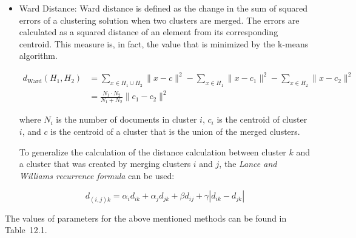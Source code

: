 \documentclass[11pt,openany,executivepaper]{book}
\begin{document}
\begin{itemize}
In contrast, the \textit{Weighted Pair Group Method with Centroid (WPGMC)}, also known as median clustering, down-weights bigger clusters so the similarity is calculated independently of the number of objects in the clusters:

\begin{equation}
d_{\text{WPGMC}}(H_k, (H_i, H_j)) =
\frac{d(H_k, H_i) + d(H_k, H_j)}{2} -
\frac{d(H_i, H_j)}{4}
\end{equation}

\item Ward Distance: Ward distance is defined as the change in the sum of squared errors of a clustering solution when two clusters are merged. The errors are calculated as a squared distance of an element from its corresponding centroid. This measure is, in fact, the value that is minimized by the k-means algorithm.

\begin{equation}
\begin{aligned}
d_{\text{Ward}}(H_1, H_2)
&= \sum_{x \in H_1 \cup H_2} \|x - c\|^2
   - \sum_{x \in H_1} \|x - c_1\|^2
   - \sum_{x \in H_2} \|x - c_2\|^2 \\
&= \frac{N_1 \cdot N_2}{N_1 + N_2} \| c_1 - c_2 \|^2
\end{aligned}
\end{equation}

where $N_i$ is the number of documents in cluster $i$, $c_i$ is the centroid of cluster $i$, and $c$ is the centroid of a cluster that is the union of the merged clusters.

To generalize the calculation of the distance calculation between cluster $k$ and a cluster that was created by merging clusters $i$ and $j$, the \textit{Lance and Williams recurrence formula} can be used:

\begin{equation}
d_{(i,j)k} = \alpha_i d_{ik} + \alpha_j d_{jk} + \beta d_{ij} + \gamma |d_{ik} - d_{jk}|
\end{equation}
\end{itemize}

The values of parameters for the above mentioned methods can be found in Table~12.1.
\end{document}
